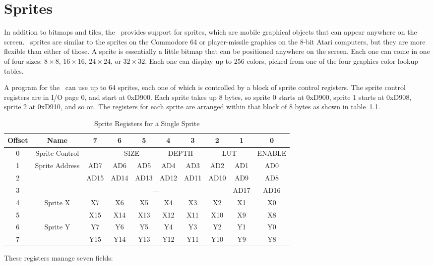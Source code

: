 \chapter{Sprites}

In addition to bitmaps and tiles, the \jr\ provides support for sprites, which are mobile graphical objects that can appear anywhere on the screen. \jr\ sprites are similar to the sprites on the Commodore 64 or player-missile graphics on the 8-bit Atari computers, but they are more flexible than either of those. A sprite is essentially a little bitmap that can be positioned anywhere on the screen. Each one can come in one of four sizes: $8 \times 8$, $16 \times 16$, $24 \times 24$, or $32 \times 32$. Each one can display up to 256 colors, picked from one of the four graphics color lookup tables.

A program for the \jr\ can use up to 64 sprites, each one of which is controlled by a block of sprite control registers. The sprite control registers are in I/O page 0, and start at 0xD900. Each sprite takes up 8 bytes, so sprite 0 starts at 0xD900, sprite 1 starts at 0xD908, sprite 2 at 0xD910, and so on. The registers for each sprite are arranged within that block of 8 bytes as shown in table~\ref{tab:sp_reg}.

\begin{table}[h]
    \begin{center}
        \begin{tabular}{|c|c|c|c|c|c|c|c|c|c|} \hline
            Offset & Name & 7 & 6 & 5 & 4 & 3 & 2 & 1 & 0 \\ \hline\hline
            0 & Sprite Control & --- & \multicolumn{2}{|c|}{SIZE} & \multicolumn{2}{|c|}{DEPTH} & \multicolumn{2}{|c|}{LUT} & ENABLE \\ \hline
            1 & \multirow{3}{*}{Sprite Address} & AD7 & AD6 & AD5 & AD4 & AD3 & AD2 & AD1 & AD0 \\ \cline{1-1}\cline{3-10}
            2 &  & AD15 & AD14 & AD13 & AD12 & AD11 & AD10 & AD9 & AD8 \\ \cline{1-1}\cline{3-10}
            3 &  & \multicolumn{6}{|c|}{---} & AD17 & AD16 \\ \hline
            4 & \multirow{2}{*}{Sprite X} & X7 & X6 & X5 & X4 & X3 & X2 & X1 & X0 \\ \cline{1-1}\cline{3-10}
            5 &  & X15 & X14 & X13 & X12 & X11 & X10 & X9 & X8 \\ \hline
            6 & \multirow{2}{*}{Sprite Y} & Y7 & Y6 & Y5 & Y4 & Y3 & Y2 & Y1 & Y0 \\ \cline{1-1}\cline{3-10}
            7 &  & Y15 & Y14 & Y13 & Y12 & Y11 & Y10 & Y9 & Y8 \\ \hline
        \end{tabular}
    \end{center}
    \caption{Sprite Registers for a Single Sprite}
    \label{tab:sp_reg}
\end{table}
These registers manage seven fields:

